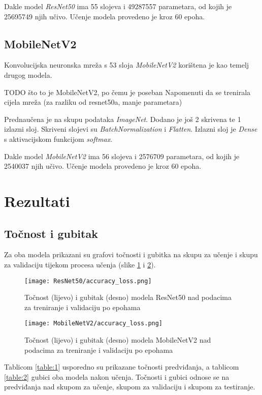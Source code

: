 \documentclass[conference, utf8]{IEEEtran}
\begin{document}
Dakle model \textit{ResNet50} ima 55 slojeva i 49287557 parametara, od kojih je 25695749 njih učivo. Učenje modela provedeno je kroz 60 epoha.


\subsection{MobileNetV2}
Konvolucijska neuronska mreža s 53 sloja \textit{MobileNetV2} korištena je kao temelj drugog modela.



TODO što to je MobileNetV2, po čemu je poseban
 Napomenuti da se trenirala cijela mreža (za razliku od resnet50a, manje parametara)



 Prednaučena je na skupu podataka \textit{ImageNet}. Dodano je još 2 skrivena te 1 izlazni sloj. Skriveni slojevi su  \textit{BatchNormalization} i \textit{Flatten}. Izlazni sloj je \textit{Dense} s aktivacijskom funkcijom \textit{softmax}.

Dakle model \textit{MobileNetV2} ima 56 slojeva i 2576709 parametara, od kojih je 2540037 njih učivo. Učenje modela provedeno je kroz 60 epoha.



\section{Rezultati}

\subsection{Točnost i gubitak}
Za oba modela prikazani su grafovi točnosti i gubitka na skupu za učenje i skupu za validaciju tijekom procesa učenja (slike \ref{fig:RN50_acc_loss} i \ref{fig:MN_acc_loss}). 
\begin{figure}[ht]
	\centering
	\texttt{[image: ResNet50/accuracy\_loss.png]}
	\caption{Točnost (lijevo) i gubitak (desno) modela ResNet50 nad podacima za treniranje i validaciju po epohama}
	\label{fig:RN50_acc_loss}
\end{figure}
\begin{figure}[ht]
	\centering
	\texttt{[image: MobileNetV2/accuracy\_loss.png]}
	\caption{Točnost (lijevo) i gubitak (desno) modela MobileNetV2 nad podacima za treniranje i validaciju po epohama}
	\label{fig:MN_acc_loss}
\end{figure}

Tablicom \ref{table:1} usporedno su prikazane točnosti predviđanja, a tablicom \ref{table:2} gubici oba modela  nakon učenja. Točnosti i gubici odnose se na predviđanja nad skupom za učenje, skupom za validaciju i skupom za testiranje. 
\end{document}
